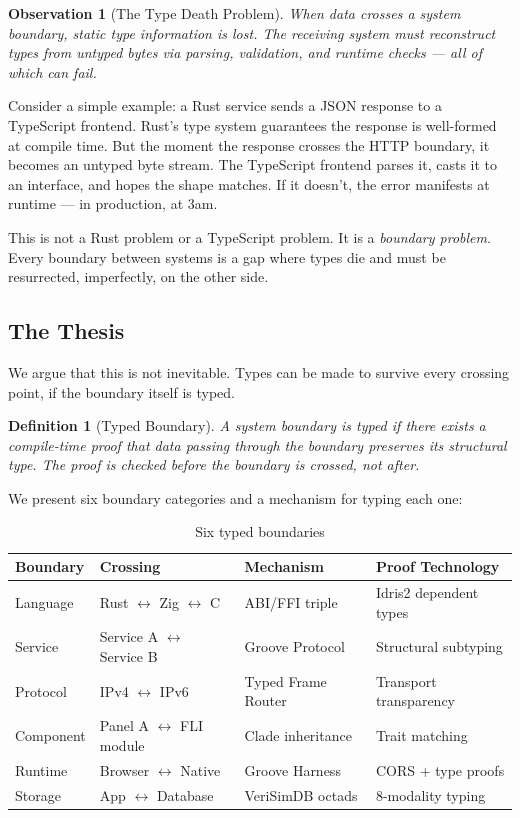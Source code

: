 \documentclass[11pt,a4paper]{article}
\newtheorem{definition}{Definition}
\newtheorem{observation}{Observation}
\begin{document}
\begin{observation}[The Type Death Problem]
When data crosses a system boundary, static type information is lost.
The receiving system must reconstruct types from untyped bytes via
parsing, validation, and runtime checks --- all of which can fail.
\end{observation}

Consider a simple example: a Rust service sends a JSON response to a
TypeScript frontend. Rust's type system guarantees the response is
well-formed at compile time. But the moment the response crosses the
HTTP boundary, it becomes an untyped byte stream. The TypeScript
frontend parses it, casts it to an interface, and hopes the shape
matches. If it doesn't, the error manifests at runtime --- in
production, at 3am.

This is not a Rust problem or a TypeScript problem. It is a
\emph{boundary problem}. Every boundary between systems is a gap where
types die and must be resurrected, imperfectly, on the other side.

\subsection{The Thesis}

We argue that this is not inevitable. Types can be made to survive
every crossing point, if the boundary itself is typed.

\begin{definition}[Typed Boundary]
A system boundary is \emph{typed} if there exists a compile-time proof
that data passing through the boundary preserves its structural type.
The proof is checked before the boundary is crossed, not after.
\end{definition}

We present six boundary categories and a mechanism for typing each one:

\begin{table}[h]
\centering
\small
\begin{tabular}{llll}
\toprule
Boundary & Crossing & Mechanism & Proof Technology \\
\midrule
Language & Rust $\leftrightarrow$ Zig $\leftrightarrow$ C
  & ABI/FFI triple & Idris2 dependent types \\
Service & Service A $\leftrightarrow$ Service B
  & Groove Protocol & Structural subtyping \\
Protocol & IPv4 $\leftrightarrow$ IPv6
  & Typed Frame Router & Transport transparency \\
Component & Panel A $\leftrightarrow$ FLI module
  & Clade inheritance & Trait matching \\
Runtime & Browser $\leftrightarrow$ Native
  & Groove Harness & CORS + type proofs \\
Storage & App $\leftrightarrow$ Database
  & VeriSimDB octads & 8-modality typing \\
\bottomrule
\end{tabular}
\caption{Six typed boundaries}
\label{tab:boundaries}
\end{table}
\end{document}
